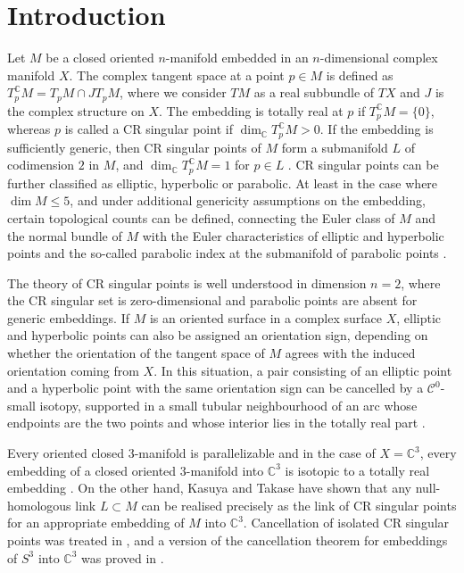 \documentclass[12pt]{amsart}
\theoremstyle{definition}
\newcommand{\C}{\mathbb{C}}
\newcommand{\cC}{\mathcal{C}}
\numberwithin{equation}{section}
\begin{document}
\section{Introduction} 
Let $M$ be a closed oriented $n$-manifold embedded in an $n$-dimensional complex manifold $X$. The complex tangent space 
at a point $p\in M$ is defined as $T_p^\C M=T_pM\cap JT_pM$, where we consider $TM$ as a real subbundle of $TX$  
and $J$ is the complex structure on $X$. The embedding is totally real at $p$ if $T_p^\C M=\{0\}$, whereas
$p$ is called a CR singular point if $\dim_\C T_p^\C M>0$.  If the embedding is sufficiently generic, then CR singular 
points of $M$ form a submanifold $L$ of codimension $2$ in $M$, and $\dim_\C T_p^\C M=1$ for $p\in L$ \cite{Lai}. 
CR singular points can be further classified as elliptic, hyperbolic or parabolic. At least in the case where 
$\dim M\le 5$, and under additional genericity assumptions on the embedding, certain topological counts can be defined, 
connecting the Euler class of $M$ and the normal bundle of $M$ with the Euler characteristics of elliptic and hyperbolic 
points and the so-called parabolic index at the submanifold of parabolic points \cite{W}.

The theory of CR singular points is well understood in dimension $n=2$, where the CR singular set is zero-dimensional 
and parabolic points are absent for generic embeddings. If $M$ is an oriented surface in a complex surface $X$, elliptic 
and hyperbolic points can also be assigned an orientation sign, depending on whether the orientation of the tangent space 
of $M$ agrees with the induced orientation coming from $X$. In this situation, a pair consisting of an elliptic point and 
a hyperbolic point with the same orientation sign can be cancelled by a $\cC^0$-small isotopy, supported in a small tubular 
neighbourhood of an arc whose endpoints are the two points and whose interior lies in the totally real part \cite{EH,F1}. 

Every oriented closed $3$-manifold is parallelizable and in the case of $X=\C^3$, every embedding of a closed oriented 
$3$-manifold into $\mathbb C^3$ is isotopic to a totally real embedding \cite{Gr,F0}. On the other hand, Kasuya and Takase 
\cite{KT} have shown that any null-homologous link $L\subset M$ can be realised precisely 
as the link of CR singular points for an appropriate embedding of $M$ into $\C^3$. Cancellation of isolated CR singular 
points was treated in \cite{E1}, and a version of the cancellation theorem for embeddings of $S^3$ into $\C^3$ was proved 
in \cite{E2}.
\end{document}
